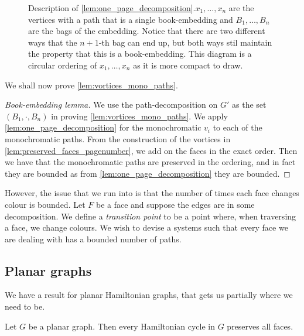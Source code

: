 \begin{figure}
	\centering
	
	\caption{Description of \cref{lem:one_page_decomposition}.\(x_1, \ldots, x_n\) are the vertices with a path that is a single book-embedding and \(B_1, \ldots, B_n\) are the bags of the embedding. Notice that there are two different ways that the \(n + 1\)-th bag can end up, but both ways stil maintain the property that this is a book-embedding. This diagram is a circular ordering of \(x_1, \ldots, x_n\) as it is more compact to draw.}\label{fig:preserving_pages}
\end{figure}

We shall now prove \cref{lem:vortices_mono_paths}.
\begin{proof}[Book-embedding lemma]
	We use the path-decomposition on \(G'\) as the set \((B_1, \cdot , B_n)\) in proving \cref{lem:vortices_mono_paths}. We apply \cref{lem:one_page_decomposition} for the monochromatic \(v_i\) to each of the monochromatic paths. From the construction of the vortices in \cref{lem:preserved_faces_pagenumber}, we add on the faces in the exact order. Then we have that the monochromatic paths are preserved in the ordering, and in fact they are bounded as from \cref{lem:one_page_decomposition} they are bounded.
\end{proof}

However, the issue that we run into is that the number of times each face changes colour is bounded. Let \(F\) be a face and suppose the edges are in some decomposition. We define a \textit{transition point} to be a point where, when traversing a face, we change colours. We wish to devise a systems such that every face we are dealing with has a bounded number of paths.

\subsection{Planar graphs}

We have a result for planar Hamiltonian graphs, that gets us partially where we need to be.
\begin{theorem}
	Let \(G\) be a planar graph. Then every Hamiltonian cycle in \(G\) preserves all faces.
\end{theorem}

